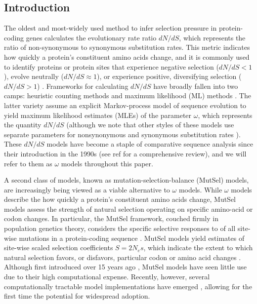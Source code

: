 \documentclass{pnastwo}
\begin{document}
\begin{article}
		
\section*{Introduction}
		
The oldest and most-widely used method to infer selection pressure in protein-coding genes calculates the evolutionary rate ratio $dN/dS$, which represents the ratio of non-synonymous to synonymous substitution rates. This metric indicates how quickly a protein's constituent amino acids change, and it is commonly used to identify proteins or protein sites that experience negative selection ($dN/dS<1$), evolve neutrally ($dN/dS\approx1$), or experience positive, diversifying selection ($dN/dS>1$) \cite{NielsenYang1998, Yangetal2000, KosakovskyPondFrost2005b, Huelsenbecketal2006}. Frameworks for calculating $dN/dS$ have broadly fallen into two camps: heuristic counting methods \cite{LWL85,NG86,Pamilo1993,Ina1995,YN00} and maximum likelihood (ML) methods \cite{GoldmanYang1994,MuseGaut1994,NielsenYang1998,Yang2006}. The latter variety assume an explicit Markov-process model of sequence evolution to yield maximum likelihood estimates (MLEs) of the parameter $\omega$, which represents the quantity $dN/dS$ (although we note that other styles of these models use separate parameters for nonsynonymous and synonymous substitution rates \cite{MuseGaut1994,KosakovskyPondMuse2005}). These $dN/dS$ models have become a staple of comparative sequence analysis since their introduction in the 1990s (see ref \cite{Anisimova2009} for a comprehensive review), and we will refer to them as $\omega$ models throughout this paper.

A second class of models, known as mutation-selection-balance (MutSel) models, are increasingly being viewed as a viable alternative to $\omega$ models. While $\omega$ models describe the how quickly a protein's constituent amino acids change, MutSel models assess the strength of natural selection operating on specific amino-acid or codon changes. In particular, the MutSel framework, couched firmly in population genetics theory, considers the specific selective responses to of all site-wise mutations in a protein-coding sequence \cite{HalpernBruno1998,Thorne2012}. MutSel models yield estimates of site-wise scaled selection coefficients $S=2N_es$, which indicate the extent to which natural selection favors, or disfavors, particular codon or amino acid changes \cite{HalpernBruno1998,YangNielsen2008,Rodrigueetal2010,Tamurietal2012}. Although first introduced over 15 years ago \cite{HalpernBruno1998}, MutSel models have seen little use due to their high computational expense. Recently, however, several computationally tractable model implementations have emerged \cite{RodrigueLartillot2014,Tamurietal2014}, allowing for the first time the potential for widespread adoption.		
		

\end{article}
\end{document}
